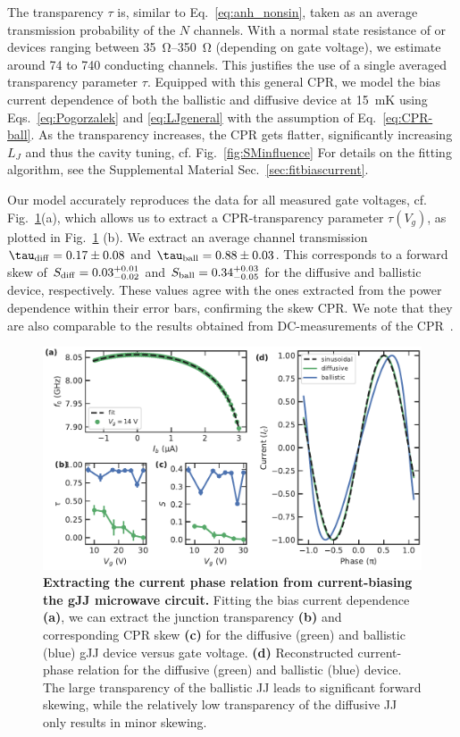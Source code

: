 The transparency $\tau$ is, similar to Eq.~\ref{eq:anh_nonsin}, taken as an average transmission probability of the $N$ channels.
%
With a normal state resistance of or devices ranging between \SIrange{35}{350}{\ohm} (depending on gate voltage), we estimate around 74 to 740 conducting channels.
%
This justifies the use of a single averaged transparency parameter $\tau$.
%
Equipped with this general CPR, we model the bias current dependence of both the ballistic and diffusive device at \SI{15}{\milli\kelvin} using Eqs.~\ref{eq:Pogorzalek} and \ref{eq:LJgeneral} with the assumption of Eq.~\ref{eq:CPR-ball}.
%
As the transparency increases, the CPR gets flatter, significantly increasing $L_J$ and thus the cavity tuning, cf. Fig.~\ref{fig:SMinfluence}
%
For details on the fitting algorithm, see the Supplemental Material Sec.~\ref{sec:fitbiascurrent}.


Our model accurately reproduces the data for all measured gate voltages, cf. Fig.~\ref{fig:figure5}(a), which allows us to extract a CPR-transparency parameter $\tau(V_g)$, as plotted in Fig.~\ref{fig:figure5}
(b).
%
We extract an average channel transmission $\tau_{\rm diff}=0.17\pm0.08$ and $\tau_{\rm ball}=0.88\pm0.03$.
%
This corresponds to a forward skew of $S_{\rm diff}=0.03_{-0.02}^{+0.01}$ and $S_{\rm ball}=0.34_{-0.05}^{+0.03}$ for the diffusive and ballistic device, respectively.
%
These values agree with the ones extracted from the power dependence within their error bars, confirming the skew CPR.
%
We note that they are also comparable to the results obtained from DC-measurements of the CPR~\cite{englishObservationNonsinusoidalCurrentphase2016,nandaCurrentPhaseRelationBallistic2017}.

\begin{figure}[t]
	\centering
	\includegraphics[width=\linewidth]{chapter-gJJ-CPR/figs/Figure5}
	\caption{
		\textbf{Extracting the current phase relation from current-biasing the gJJ microwave circuit.}
		Fitting the bias current dependence \textbf{(a)}, we can extract the junction transparency \textbf{(b)} and corresponding CPR skew \textbf{(c)} for the diffusive (green) and ballistic (blue) gJJ device versus gate voltage.
		\textbf{(d)} Reconstructed current-phase relation for the diffusive (green) and ballistic (blue) device.
		The large transparency of the ballistic JJ leads to significant forward skewing, while the relatively low transparency of the diffusive JJ only results in minor skewing.
	}
	\label{fig:figure5}
\end{figure}

